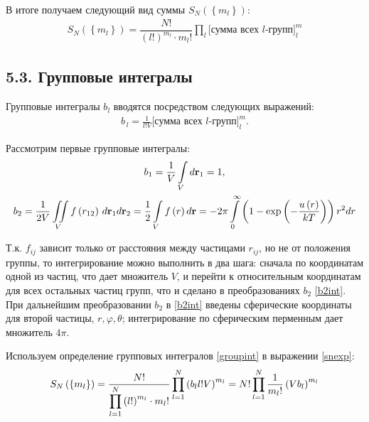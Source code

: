 В итоге получаем следующий вид суммы $S_N \left( \left\{ m_l \right\} \right)$:
\vverh
\begin{gather}
	S_N \left( \left\{ m_l \right\} \right) = \dfrac{N!}{\displaystyle \left( l! \right)^{m_l} \cdot m_l!} \prod_{l} \bigg[ \text{сумма всех $l$-групп} \bigg]^m_l \label{snexp}
\end{gather}

\subsection*{\textbf{5.3.} Групповые интегралы \cite{mayer}}

Групповые интегралы $b_l$ вводятся посредством следующих выражений:
\vverh
\begin{gather}
	b_{\, l} = \frac{1}{l! V} \bigg[ \text{сумма всех $l$-групп} \bigg]^m_l . \label{groupint}
\end{gather}

Рассмотрим первые групповые интегралы:
\vverh
\begin{gather}
	b_1 = \frac{1}{V} \int\limits_V d \mathbf{r}_1 = 1, \notag \\
	b_2 = \frac{1}{2 V} \iint\limits_V f \left( r_{12} \right) \, d \mathbf{r}_1 d \mathbf{r}_2 = \frac{1}{2} \int\limits_V f \left( r \right) d \mathbf{r} = - 2 \pi \int\limits_{0}^{\infty} \left( 1 - \exp \left( - \frac{u \left( r \right)}{kT} \right) \right) r^2 d r \label{b2int}  
\end{gather}

Т.к. $f_{ij}$ зависит только от расстояния между частицами $r_{ij}$, но не от положения группы, то интегрирование можно выполнить в два шага: сначала по координатам одной из частиц, что дает множитель $V$, и перейти к относительным координатам для всех остальных частиц групп, что и сделано в преобразованиях $b_2$ \eqref{b2int}. При дальнейшим преобразовании $b_2$ в \eqref{b2int} введены сферические координаты для второй частицы, $r, \varphi, \theta$; интегрирование по сферическим перменным дает множитель $4 \pi$.  

Используем определение групповых интегралов \eqref{groupint} в выражении \eqref{snexp}:
\vverh
\begin{gather}
	S_N \left( \left\{ m_l \right\} \right) = \frac{N!}{\displaystyle\prod_{l=1}^{N} \left( l! \right)^{m_l} \cdot m_l !} \prod_{l=1}^{N} \left( b_l l! V \right)^{m_l} = N! \prod_{l=1}^{N}  \frac{1}{m_l!} \left( V b_l \right)^{m_l} \label{snexp2}
\end{gather}

